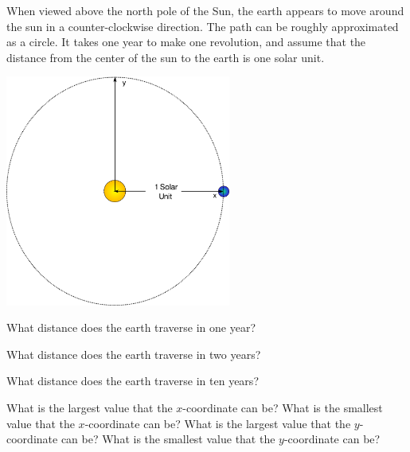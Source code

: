 
\begin{problem}
\item When viewed above the north pole of the Sun, the earth appears
  to move around the sun in a counter-clockwise direction. The path
  can be roughly approximated as a circle. It takes
  one year to make one revolution, and assume that the distance from
  the center of the sun to the earth is one solar unit.

  \begin{center}
    \includegraphics[width=20em]{angles/img/simpleSolarSystem}
  \end{center}

  \begin{subproblem}
  \item What distance does the earth traverse in one year?
    \vfill
  \item What distance does the earth traverse in two years?
    \vfill
  \item What distance does the earth traverse in ten years?
    \vfill
  \item What is the largest value that the $x$-coordinate can be?
    What is the smallest value that the $x$-coordinate can be?
    What is the largest value that the $y$-coordinate can be?
    What is the smallest value that the $y$-coordinate can be?
    \vfill
  \end{subproblem}

\end{problem}


